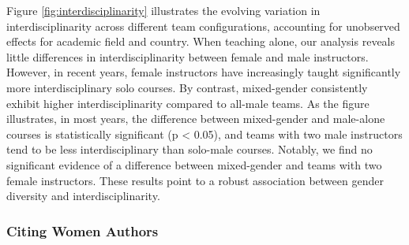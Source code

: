 \documentclass[
  british,
  12pt, %
]{article}
\begin{document}
Figure \ref{fig:interdisciplinarity} illustrates the evolving variation in interdisciplinarity across different team configurations, accounting for unobserved effects for academic field and country. When teaching alone, our analysis reveals little differences in interdisciplinarity between female and male instructors. However, in recent years, female instructors have increasingly taught significantly more interdisciplinary solo courses. By contrast, mixed-gender consistently exhibit higher interdisciplinarity compared to all-male teams. As the figure illustrates, in most years, the difference between mixed-gender and male-alone courses is statistically significant (p \textless{} 0.05), and teams with two male instructors tend to be less interdisciplinary than solo-male courses. Notably, we find no significant evidence of a difference between mixed-gender and teams with two female instructors. These results point to a robust association between gender diversity and interdisciplinarity.

\subsubsection{Citing Women Authors}\label{citing-women-authors}
\end{document}
